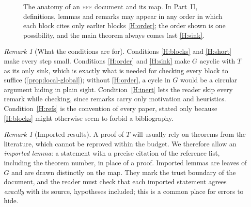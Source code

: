 \documentclass[11pt]{article}
\theoremstyle{plain}
\theoremstyle{definition}
\theoremstyle{remark}
\newtheorem{remark}[theorem]{Remark}
\theoremstyle{definition}
\theoremstyle{plain}
\theoremstyle{remark}
\newcommand{\HFF}{\textsc{hff}}
\begin{document}
\begin{figure}[ht]
\caption{The anatomy of an \HFF{} document and its map. In Part~II, definitions, lemmas and remarks may appear in any order in which each block cites only earlier blocks \ref{H:order}; the order shown is one possibility, and the main theorem always comes last \ref{H:sink}.}\label{fig:anatomy}
\end{figure}

\begin{remark}[What the conditions are for]
Conditions \ref{H:blocks} and \ref{H:short} make every step small. Conditions \ref{H:order} and \ref{H:sink} make $G$ acyclic with $T$ as its only sink, which is exactly what is needed for checking every block to suffice (\cref{prop:local-global}); without \ref{H:order}, a cycle in $G$ would be a circular argument hiding in plain sight. Condition~\ref{H:inert} lets the reader skip every remark while checking, since remarks carry only motivation and heuristics. Condition~\ref{H:refs} is the convention of every paper, stated only because \ref{H:blocks} might otherwise seem to forbid a bibliography.
\end{remark}

\begin{remark}[Imported results]\label{rem:imported}
A proof of $T$ will usually rely on theorems from the literature, which cannot be reproved within the budget. We therefore allow an \emph{imported lemma}: a statement with a precise citation of the reference list, including the theorem number, in place of a proof. Imported lemmas are leaves of $G$ and are drawn distinctly on the map. They mark the trust boundary of the document, and the reader must check that each imported statement agrees \emph{exactly} with its source, hypotheses included; this is a common place for errors to hide.
\end{remark}
\end{document}

